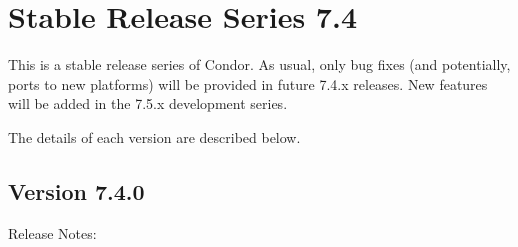 
\section{\label{sec:History-7-4}Stable Release Series 7.4}

This is a stable release series of Condor.
As usual, only bug fixes (and potentially, ports to new platforms)
will be provided in future 7.4.x releases.
New features will be added in the 7.5.x development series.

The details of each version are described below.

\subsection*{\label{sec:New-7-4-0}Version 7.4.0}

\noindent Release Notes:

